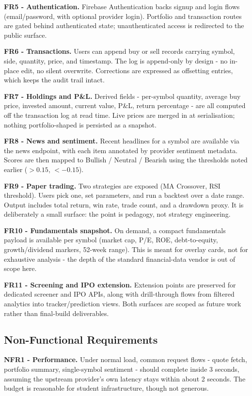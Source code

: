 \documentclass[12pt,a4paper]{report}
\numberwithin{equation}{chapter}
\begin{document}
\textbf{FR5 - Authentication.} Firebase Authentication backs signup and login flows (email/password, with optional provider login). Portfolio and transaction routes are gated behind authenticated state; unauthenticated access is redirected to the public surface.

\textbf{FR6 - Transactions.} Users can append buy or sell records carrying symbol, side, quantity, price, and timestamp. The log is append-only by design - no in-place edit, no silent overwrite. Corrections are expressed as offsetting entries, which keeps the audit trail intact.

\textbf{FR7 - Holdings and P\&L.} Derived fields - per-symbol quantity, average buy price, invested amount, current value, P\&L, return percentage - are all computed off the transaction log at read time. Live prices are merged in at serialisation; nothing portfolio-shaped is persisted as a snapshot.

\textbf{FR8 - News and sentiment.} Recent headlines for a symbol are available via the news endpoint, with each item annotated by provider sentiment metadata. Scores are then mapped to Bullish / Neutral / Bearish using the thresholds noted earlier ($>0.15$, $<-0.15$).

\textbf{FR9 - Paper trading.} Two strategies are exposed (MA Crossover, RSI threshold). Users pick one, set parameters, and run a backtest over a date range. Output includes total return, win rate, trade count, and a drawdown proxy. It is deliberately a small surface: the point is pedagogy, not strategy engineering.

\textbf{FR10 - Fundamentals snapshot.} On demand, a compact fundamentals payload is available per symbol (market cap, P/E, ROE, debt-to-equity, growth/dividend markers, 52-week range). This is meant for overlay cards, not for exhaustive analysis - the depth of the standard financial-data vendor is out of scope here.

\textbf{FR11 - Screening and IPO extension.} Extension points are preserved for dedicated screener and IPO APIs, along with drill-through flows from filtered analytics into tracker/prediction views. Both surfaces are scoped as future work rather than final-build deliverables.

\subsection{Non-Functional Requirements}

\textbf{NFR1 - Performance.} Under normal load, common request flows - quote fetch, portfolio summary, single-symbol sentiment - should complete inside 3 seconds, assuming the upstream provider's own latency stays within about 2 seconds. The budget is reasonable for student infrastructure, though not generous.
\end{document}
